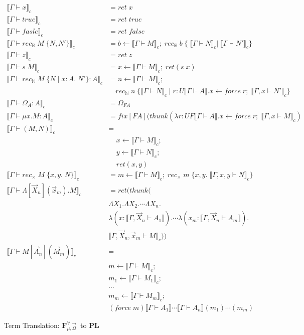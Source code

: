 \documentclass[acmsmall]{acmart}
\newcommand{\den}[1]{\llbracket #1\rrbracket}
\newcommand{\source}{$\mathbf{F}_{\mu,\Omega}^{\forall\to}\;$}
\newcommand{\pl}{$\mathbf{PL}$}
\begin{document}
\begin{figure}[H]
  \centering
  \scriptsize
\begin{align*}
  \den{\Gamma \vdash x}_c &= ret\;x \\
  \den{\Gamma \vdash true}_c &= ret\; true\\
  \den{\Gamma \vdash fasle}_c &= ret\; false\\
  \den{\Gamma \vdash rec_{\mathbb{B}}\;M \; \{N,N'\}}_c &= b \leftarrow \den{\Gamma \vdash M}_c;\; rec_{\mathbb{B}}\; b \; \{\;\den{\Gamma \vdash N}_c|\;\den{\Gamma \vdash N'}_c\}\\
  \den{\Gamma \vdash z}_c &= ret\;z\\
  \den{\Gamma \vdash s \;M}_c &= x \leftarrow \den{\Gamma \vdash M}_c;\; ret(s \; x)\\
  \den{\Gamma \vdash rec_{\mathbb{N}}\;M \; \{N \;|\; x:A.\; N'\}  : A}_c &= n \leftarrow \den{\Gamma \vdash M}_c;\\
  &\quad rec_{\mathbb{N}}\;n\; \{\den{\Gamma \vdash N}_c \;|\; r: U\den{\Gamma \vdash A}. x \leftarrow force \;r; \; \den{\Gamma,x \vdash N'}_c\}\\
  \den{\Gamma \vdash \Omega_A : A}_c &= \Omega_{FA}\\
  \den{\Gamma \vdash \mu x.M : A}_c &= fix[FA](thunk(\lambda r : UF\den{\Gamma \vdash A}. x \leftarrow force\;r;\; \den{\Gamma,x \vdash M}_c)\\
  \den{\Gamma \vdash (M,N)}_c &=\\
  &\;\;\;\; x \leftarrow \den{\Gamma \vdash M}_c;\\
  &\;\;\;\; y \leftarrow \den{\Gamma \vdash N}_c;\\
  &\;\;\;\; ret (x,y)\\
  \den{\Gamma \vdash rec_\times\;M \;\{x,y.\; N\}}_c &= m \leftarrow \den{\Gamma \vdash M}_c;\; rec_\times\;m\;\{x,y.\; \den{\Gamma,x,y\vdash N}_c\}\\
  \den{\Gamma \vdash \Lambda[\overrightarrow{X}_n](\overrightarrow{x}_m).M}_c &= 
  ret(thunk(\\
  &\Lambda X_1.\Lambda X_2.\cdots\Lambda X_n.\\ 
  &\lambda(x:\den{\Gamma,\overrightarrow{X}_n \vdash A_1}).\cdots \lambda(x_m: \den{\Gamma,\overrightarrow{X}_n \vdash A_m}).\\
  &\den{\Gamma ,\overrightarrow{X}_n,\overrightarrow{x}_m\vdash M}_c))\\
  \den{\Gamma \vdash M[\overrightarrow{A}_n](\overrightarrow{M}_m)}_c &= \\
  &m \leftarrow \den{\Gamma \vdash M}_c;\\
  &m_1 \leftarrow \den{\Gamma \vdash M_1}_c;\\
  &\cdots\\
  &m_m \leftarrow \den{\Gamma \vdash M_m}_c;\\
  &(force \;m)\den{\Gamma \vdash A_1}\cdots\den{\Gamma \vdash A_n}(m_1)\cdots(m_m)
  \end{align*}
  \caption{Term Translation: \source to \pl}
\end{figure}
\end{document}
